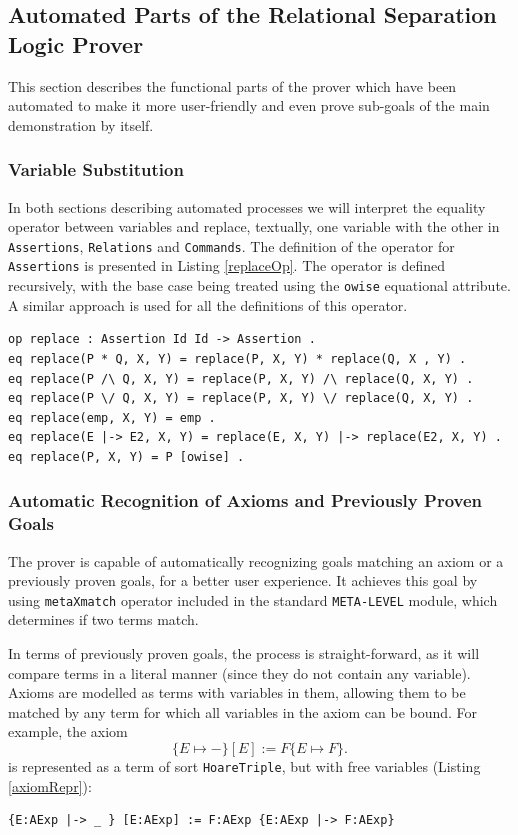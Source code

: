 \documentclass[12pt,a4paper]{article}
\begin{document}
\subsection{Automated Parts of the Relational Separation Logic Prover}
This section describes the functional parts of the prover which have been automated to make it more user-friendly and even prove sub-goals of the main demonstration by itself.
\subsubsection{Variable Substitution}
In both sections describing automated processes we will interpret the equality operator between variables and replace, textually, one variable with the other in \texttt{Assertions}, \texttt{Relations} and \texttt{Commands}. The definition of the operator for \texttt{Assertions} is presented in Listing \ref{replaceOp}. The operator is defined recursively, with the base case being treated using the \texttt{owise} equational attribute. A similar approach is used for all the definitions of this operator. 
\begin{lstlisting}[label=replaceOp,caption=Replace operator definition for assertions]
op replace : Assertion Id Id -> Assertion .
eq replace(P * Q, X, Y) = replace(P, X, Y) * replace(Q, X , Y) .
eq replace(P /\ Q, X, Y) = replace(P, X, Y) /\ replace(Q, X, Y) .
eq replace(P \/ Q, X, Y) = replace(P, X, Y) \/ replace(Q, X, Y) .
eq replace(emp, X, Y) = emp .
eq replace(E |-> E2, X, Y) = replace(E, X, Y) |-> replace(E2, X, Y) .
eq replace(P, X, Y) = P [owise] .
\end{lstlisting}
\subsubsection{Automatic Recognition of Axioms and Previously Proven Goals}
The prover is capable of automatically recognizing goals matching an axiom or a previously proven goals, for a better user experience.
It achieves this goal by using \texttt{metaXmatch} operator included in the standard \texttt{META-LEVEL} module, which determines if two terms match. 

In terms of previously proven goals, the process is straight-forward, as it will compare terms in a literal manner (since they do not contain any variable).
\\

Axioms are modelled as terms with variables in them, allowing them to be matched by any term for which all variables in the axiom can be bound.
	For example, the axiom 
	\[
		\{E \mapsto -\} [E] := F \{E \mapsto F\}.
	\]
	is represented as a term of sort \texttt{HoareTriple}, but with free variables (Listing \ref{axiomRepr}):
	\begin{lstlisting}[caption=Example Axiom,label=axiomRepr]
	{E:AExp |-> _ } [E:AExp] := F:AExp {E:AExp |-> F:AExp}\end{lstlisting}
	
\end{document}
